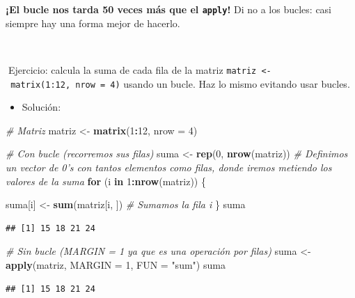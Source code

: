 \documentclass[11pt,]{book}
\newenvironment{Shaded}{\begin{snugshade}}{\end{snugshade}}
\newcommand{\CommentTok}[1]{\textcolor[rgb]{0.37,0.37,0.37}{\textit{#1}}}
\newcommand{\ControlFlowTok}[1]{\textcolor[rgb]{0.27,0.27,0.27}{\textbf{#1}}}
\newcommand{\DataTypeTok}[1]{\textcolor[rgb]{0.27,0.27,0.27}{#1}}
\newcommand{\DecValTok}[1]{\textcolor[rgb]{0.06,0.06,0.06}{#1}}
\newcommand{\KeywordTok}[1]{\textcolor[rgb]{0.27,0.27,0.27}{\textbf{#1}}}
\newcommand{\NormalTok}[1]{#1}
\newcommand{\OperatorTok}[1]{\textcolor[rgb]{0.43,0.43,0.43}{\textbf{#1}}}
\newcommand{\StringTok}[1]{\textcolor[rgb]{0.5,0.5,0.5}{#1}}
\providecommand{\tightlist}{%
  \setlength{\itemsep}{0pt}\setlength{\parskip}{0pt}}
\begin{document}
\textbf{¡El bucle nos tarda 50 veces más que el \texttt{apply}!} Di no a los bucles: casi siempre hay una forma mejor de hacerlo.

~

📝Ejercicio: calcula la suma de cada fila de la matriz \texttt{matriz\ \textless{}-\ matrix(1:12,\ nrow\ =\ 4)} usando un bucle. Haz lo mismo evitando usar bucles.

\begin{itemize}
\tightlist
\item
  Solución:
\end{itemize}

\begin{Shaded}
\begin{Highlighting}[]
\CommentTok{# Matriz}
\NormalTok{matriz <-}\StringTok{ }\KeywordTok{matrix}\NormalTok{(}\DecValTok{1}\OperatorTok{:}\DecValTok{12}\NormalTok{, }\DataTypeTok{nrow =} \DecValTok{4}\NormalTok{)}

\CommentTok{# Con bucle (recorremos sus filas)}
\NormalTok{suma <-}\StringTok{ }\KeywordTok{rep}\NormalTok{(}\DecValTok{0}\NormalTok{, }\KeywordTok{nrow}\NormalTok{(matriz)) }\CommentTok{# Definimos un vector de 0's con tantos elementos como filas, donde iremos metiendo los valores de la suma}
\ControlFlowTok{for}\NormalTok{ (i }\ControlFlowTok{in} \DecValTok{1}\OperatorTok{:}\KeywordTok{nrow}\NormalTok{(matriz)) \{}
  
\NormalTok{  suma[i] <-}\StringTok{ }\KeywordTok{sum}\NormalTok{(matriz[i, ]) }\CommentTok{# Sumamos la fila i}
\NormalTok{\}}
\NormalTok{suma}
\end{Highlighting}
\end{Shaded}

\begin{verbatim}
## [1] 15 18 21 24
\end{verbatim}

\begin{Shaded}
\begin{Highlighting}[]
\CommentTok{# Sin bucle (MARGIN = 1 ya que es una operación por filas)}
\NormalTok{suma <-}\StringTok{ }\KeywordTok{apply}\NormalTok{(matriz, }\DataTypeTok{MARGIN =} \DecValTok{1}\NormalTok{, }\DataTypeTok{FUN =} \StringTok{"sum"}\NormalTok{)}
\NormalTok{suma}
\end{Highlighting}
\end{Shaded}

\begin{verbatim}
## [1] 15 18 21 24
\end{verbatim}
\end{document}
